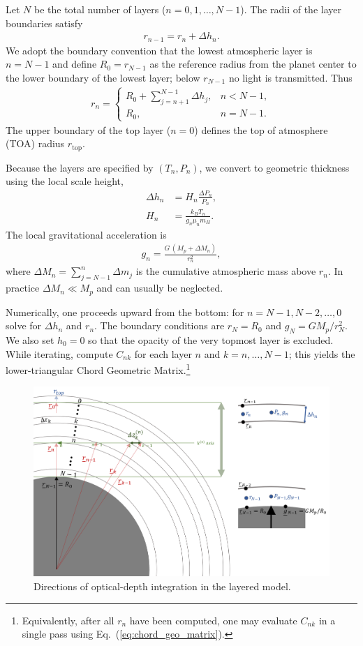 Let $N$ be the total number of layers ($n=0,1,\dots,N-1$).
The radii of the layer boundaries satisfy
\begin{align}
r_{n-1} = r_n + \Delta h_n .
\end{align}
We adopt the boundary convention that the lowest atmospheric layer is $n=N-1$ and define $R_0=r_{N-1}$ as the reference radius from the planet center to the lower boundary of the lowest layer; below $r_{N-1}$ no light is transmitted. Thus
\begin{align}
    r_{n} =
\left\{
\begin{array}{ll}
\displaystyle R_0 + \sum_{j=n+1}^{N-1} \Delta h_j , & n < N-1, \\[6pt]
R_0 , & n = N-1 .
\end{array}
\right.
\end{align}
The upper boundary of the top layer ($n=0$) defines the top of atmosphere (TOA) radius $r_{\mathrm{top}}$.

Because the layers are specified by $(T_n,P_n)$, we convert to geometric thickness using the local scale height,
\begin{align}
\Delta h_n &=  H_n \frac{\Delta P_n}{P_n} ,\\
\label{eq:H_each}
 H_n &= \frac{k_B T_n}{g_n \mu_n m_H} .
\end{align}
The local gravitational acceleration is
\begin{align}
g_n = \frac{G \, (M_p + \Delta M_n)}{r_n^2} ,
\end{align}
where $\Delta M_n = \sum_{j=N-1}^{n} \Delta m_j$ is the cumulative atmospheric mass above $r_n$. In practice $\Delta M_n \ll M_p$ and can usually be neglected.

Numerically, one proceeds upward from the bottom: for $n = N-1, N-2, \dots, 0$ solve for $\Delta h_n$ and $r_n$. The boundary conditions are $r_N = R_0$ and $g_N = G M_p / r_N^2$. We also set $h_0=0$ so that the opacity of the very topmost layer is excluded. While iterating, compute $C_{nk}$ for each layer $n$ and $k=n,\dots, N-1$; this yields the lower-triangular Chord Geometric Matrix.\footnote{Equivalently, after all $r_n$ have been computed, one may evaluate $C_{nk}$ in a single pass using Eq.~(\ref{eq:chord_geo_matrix}).}

\begin{figure}[htb]
\begin{center}
\includegraphics[width=1.0\linewidth]{fig/transmission_coord.PNG}
\caption{Directions of optical-depth integration in the layered model. \label{fig:transmission_coord}}
\end{center}
\end{figure}
